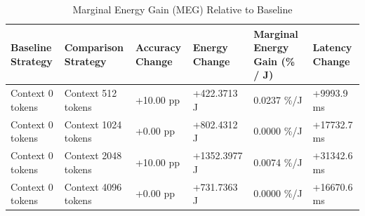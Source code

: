 \begin{table}
\caption{Marginal Energy Gain (MEG) Relative to Baseline}
\label{tab:marginal_energy_gain}
\begin{tabular}{llllll}
\toprule
Baseline Strategy & Comparison Strategy & Accuracy Change & Energy Change & Marginal Energy Gain (\% / J) & Latency Change \\
\midrule
Context 0 tokens & Context 512 tokens & +10.00 pp & +422.3713 J & 0.0237 \%/J & +9993.9 ms \\
Context 0 tokens & Context 1024 tokens & +0.00 pp & +802.4312 J & 0.0000 \%/J & +17732.7 ms \\
Context 0 tokens & Context 2048 tokens & +10.00 pp & +1352.3977 J & 0.0074 \%/J & +31342.6 ms \\
Context 0 tokens & Context 4096 tokens & +0.00 pp & +731.7363 J & 0.0000 \%/J & +16670.6 ms \\
\bottomrule
\end{tabular}
\end{table}
